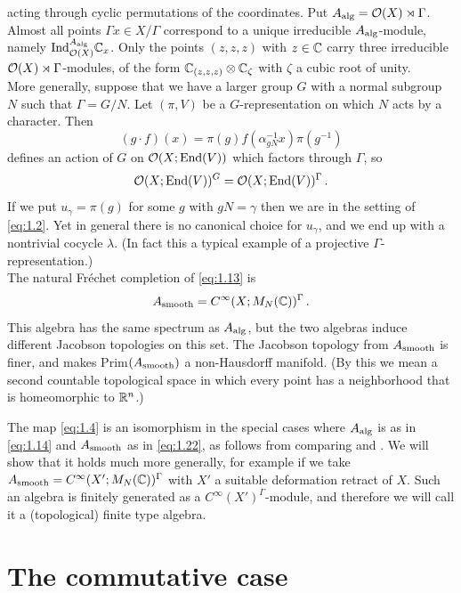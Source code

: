 acting through cyclic permutations of the coordinates. Put $A_\mathrm{alg} =
\mathcal O (X) \rtimes \Gamma$.  Almost all points $\Gamma x \in X /
\Gamma$ correspond to a unique irreducible $A_\mathrm{alg}$-module,
namely $\mathrm{Ind}_{\mathcal O (X)}^{A_\mathrm{alg}} \mathbb C_x$. Only the points
$(z,z,z)$ with $z \in \mathbb C$ carry three irreducible $\mathcal O (X)
\rtimes \Gamma$-modules, of the form $\mathbb C_{(z,z,z)} \otimes \mathbb
C_{\zeta}$ with $\zeta$ a cubic root of unity.
\\[2mm]
More generally, suppose that we have a larger group $G$ with a
normal subgroup $N$ such that $\Gamma = G / N$. Let $(\pi ,V)$ be a
$G$-representation on which $N$ acts by a character. Then
\[
(g \cdot f)(x) = \pi (g) f (\alpha_{g N}^{-1} x) \pi (g^{-1})
\]
defines an action of $G$ on $\mathcal O (X ; \mathrm{End} (V))$ which
factors through $\Gamma$, so
\[
\mathcal O (X ; \mathrm{End} (V))^G = \mathcal O (X ; \mathrm{End} (V))^\Gamma \,.
\]
If we put $u_\gamma = \pi (g)$ for some $g$ with $g N = \gamma$
then we are in the setting of \eqref{eq:1.2}. Yet in general
there is no canonical choice for $u_\gamma$, and we end up with a
nontrivial cocycle $\lambda$. (In fact this a typical example of a
projective $\Gamma$-representation.)\\[2mm]

The natural Fr\'echet completion of \eqref{eq:1.13} is
\begin{equation}\label{eq:1.22}
A_\mathrm{smooth} = C^\infty (X ; M_N (\mathbb C))^\Gamma \,.
\end{equation}
This algebra has the same spectrum as $A_\mathrm{alg}$, but the two algebras 
induce different Jacobson topologies on this set. The Jacobson 
topology from $A_\mathrm{smooth}$ is finer, and makes Prim$ (A_\mathrm{smooth} )$ a non-Hausdorff manifold. 
(By this we mean a second countable topological space in which every point has a
neighborhood that is homeomorphic to $\mathbb R^n$.)

The map \eqref{eq:1.4} is an isomorphism in the special cases where 
$A_\mathrm{alg}$ is as in \eqref{eq:1.14} and $A_\mathrm{smooth}$
as in \eqref{eq:1.22}, as follows from comparing \cite{KNS} and
\cite{Was}. We will show that it holds much more generally, for
example if we take $A_\mathrm{smooth} = C^\infty (X' ; M_N (\mathbb C))^\Gamma$
with $X'$ a suitable deformation retract of $X$. Such an algebra
is finitely generated as a $C^\infty (X')^\Gamma$-module, and
therefore we will call it a (topological) finite type algebra.
\vspace{4mm}





\section{The commutative case}
\label{sec:1.2}

